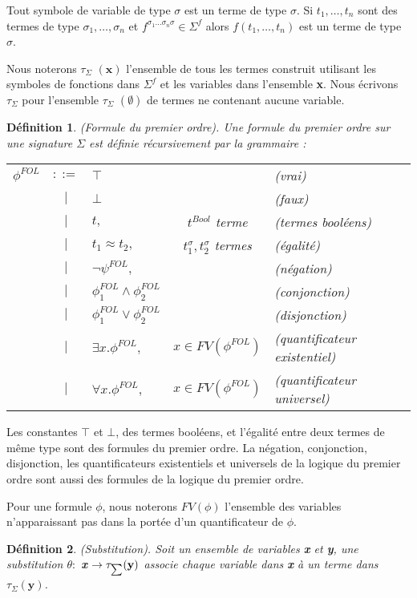 \documentclass[11pt,openany]{article}
\newcommand\smallsum{\mathsmaller\sum}
\newtheorem{definition}{D\'efinition}[subsection]
\begin{document}
	Tout symbole de variable de type $\sigma$ est un terme de type $\sigma$. Si $t_{1},\ldots,t_{n}$ sont des termes de type $\sigma_{1},\ldots,\sigma_{n}$ et $f^{\sigma_{1} \ldots\sigma_{n} \sigma} \in \Sigma^{f}$ alors $f(t_{1},\ldots,t_{n})$ est un terme de type $\sigma$.

Nous noterons $\tau_{\Sigma}$ $(\textbf{x})$ l'ensemble de tous les termes construit utilisant les symboles de fonctions dans $\Sigma^{f}$ et les variables dans l'ensemble \textbf{x}. Nous \'ecrivons $\tau_{\Sigma}$ pour l'ensemble $\tau_{\Sigma}$ $(\emptyset)$ de termes ne contenant aucune variable.
\begin{definition} 
(Formule du premier ordre). Une formule du premier ordre sur une signature $\Sigma$ est d\'efinie r\'ecursivement par la grammaire :
\begin{tabular}{lclcl}
$\phi^{FOL}$ & $::=$ & $\top$ & & (vrai)\\
 & $|$ & $\bot$ & & (faux)\\
 & $|$ & $t,$ & $t^{Bool}$ terme & (termes bool\'eens)\\
 & $|$ & $t_{1} \approx t_{2},$ & $t_{1}^{\sigma},t_{2}^{\sigma}$ termes & (\'egalit\'e)\\
 & $|$ & $\neg\psi^{FOL},$ & & (n\'egation)\\
 & $|$ & $\phi_{1}^{FOL} \land \phi_{2}^{FOL}$ & & (conjonction)\\
 & $|$ & $\phi_{1}^{FOL} \lor \phi_{2}^{FOL}$ & & (disjonction)\\
 & $|$ & $\exists x.\phi^{FOL},$ & $x\in FV(\phi^{FOL})$ & (quantificateur existentiel)\\
 & $|$ & $\forall x.\phi^{FOL},$ & $x\in FV(\phi^{FOL})$ & (quantificateur universel)

\end{tabular}
\end{definition}
Les constantes $\top$ et $\bot$, des termes bool\'eens, et l'\'egalit\'e entre deux termes de m\^eme type sont des formules du premier ordre. La n\'egation, conjonction, disjonction, les quantificateurs existentiels et universels de la logique du premier ordre sont aussi des formules de la logique du premier ordre.

	Pour une formule $\phi$, nous noterons $FV(\phi)$ l'ensemble des variables n'apparaissant pas dans la port\'ee d'un quantificateur de $\phi$.

\begin{definition}
(Substitution). Soit un ensemble de variables \textbf{x} et \textbf{y}, une substitution $\theta :$ \textbf{x} $\rightarrow \tau_{\smallsum}(\textbf{y})$ associe chaque variable dans \textbf{x} \`a un terme dans $\tau_{\Sigma}(\textbf{y})$.
\end{definition}
\end{document}
